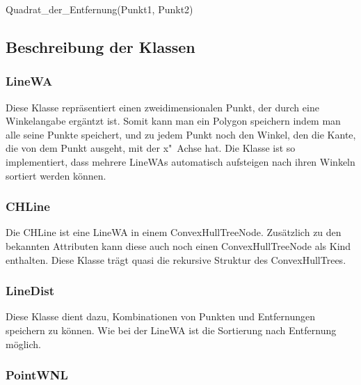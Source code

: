 \begin{function}[!ht]
	\caption{Quadrat\_der\_Entfernung(Punkt1, Punkt2)}
\end{function}


\clearpage
\subsection{Beschreibung der Klassen}

\subsubsection{LineWA}

Diese Klasse repräsentiert einen zweidimensionalen Punkt, der durch eine Winkelangabe ergäntzt ist. Somit kann man ein Polygon speichern indem man alle seine Punkte speichert, und zu jedem Punkt noch den Winkel, den die Kante, die von dem Punkt ausgeht, mit der x"~Achse hat. Die Klasse ist so implementiert, dass mehrere LineWAs automatisch aufsteigen nach ihren Winkeln sortiert werden können.

\subsubsection{CHLine}

Die CHLine ist eine LineWA in einem ConvexHullTreeNode. Zusätzlich zu den bekannten Attributen kann diese auch noch einen ConvexHullTreeNode als Kind enthalten. Diese Klasse trägt quasi die rekursive Struktur des ConvexHullTrees.

\subsubsection{LineDist}

Diese Klasse dient dazu, Kombinationen von Punkten und Entfernungen speichern zu können. Wie bei der LineWA ist die Sortierung nach Entfernung möglich.

\subsubsection{PointWNL}

